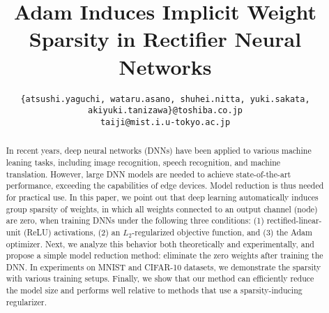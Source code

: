\documentclass[conference]{IEEEtran}
\begin{document}
\def\BibTeX{{\rm B\kern-.05em{\sc i\kern-.025em b}\kern-.08em
    T\kern-.1667em\lower.7ex\hbox{E}\kern-.125emX}}

\title{Adam Induces Implicit Weight Sparsity in Rectifier Neural Networks}
\author{
	\small
	\texttt{\{atsushi.yaguchi, wataru.asano, shuhei.nitta, yuki.sakata, akiyuki.tanizawa\}@toshiba.co.jp} \\
	\texttt{taiji@mist.i.u-tokyo.ac.jp}
	\normalsize
}
\maketitle

\begin{abstract}
In recent years, deep neural networks (DNNs) have been applied to various machine leaning tasks, including image recognition, speech recognition, and machine translation. 
However, large DNN models are needed to achieve state-of-the-art performance, 
exceeding the capabilities of edge devices. Model reduction is thus needed for practical use. 
In this paper, we point out that deep learning automatically induces group sparsity of weights, in which all weights connected to an output channel (node) are zero, when training DNNs under the following three conditions: (1) rectified-linear-unit (ReLU) activations, (2) an $L_2$-regularized objective function, and (3) the Adam optimizer.
Next, we analyze this behavior both theoretically and experimentally, and propose a simple model reduction method: eliminate the zero weights after training the DNN. 
In experiments on MNIST and CIFAR-10 datasets, we demonstrate the sparsity with various training setups.
Finally, we show that our method can efficiently reduce the model size and performs well relative to  methods that use a sparsity-inducing regularizer.
\end{abstract}
\end{document}
